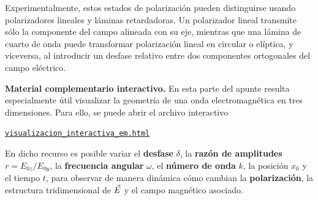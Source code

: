 \documentclass[../main.tex]{subfiles}
\begin{document}
\begin{observacion}
Experimentalmente, estos estados de polarización pueden distinguirse usando polarizadores lineales y láminas retardadoras. Un polarizador lineal transmite sólo la componente del campo alineada con su eje, mientras que una lámina de cuarto de onda puede transformar polarización lineal en circular o elíptica, y viceversa, al introducir un desfase relativo entre dos componentes ortogonales del campo eléctrico.
\end{observacion}

\begin{cajaidea}
\textbf{Material complementario interactivo.} En esta parte del apunte resulta especialmente útil visualizar la geometría de una onda electromagnética en tres dimensiones. Para ello, se puede abrir el archivo interactivo
\begin{center}
    \href{run:./visualizacion_interactiva_em.html}{\texttt{visualizacion\_interactiva\_em.html}}
\end{center}
En dicho recurso es posible variar el \textbf{desfase} $\delta$, la \textbf{razón de amplitudes} $r=E_{0z}/E_{0y}$, la \textbf{frecuencia angular} $\omega$, el \textbf{número de onda} $k$, la posición $x_0$ y el tiempo $t$, para observar de manera dinámica cómo cambian la \textbf{polarización}, la estructura tridimensional de $\vec{E}$ y el campo magnético asociado.
\end{cajaidea}


\end{document}
